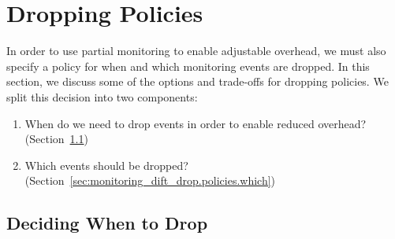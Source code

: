 \section{Dropping Policies} 
\label{sec:monitoring_dift_drop.policies}

In order to use partial monitoring to enable adjustable overhead, we must also
specify a policy for when and which monitoring events are dropped. In this
section, we discuss some of the options and trade-offs for dropping policies.
We split this decision into two components: 
\begin{enumerate} 
  \item When do we need to drop events in order to enable reduced overhead? (Section~\ref{sec:monitoring_dift_drop.policies.when}) 
  \item Which events should be dropped? (Section~\ref{sec:monitoring_dift_drop.policies.which}) 
\end{enumerate}

\subsection{Deciding When to Drop} 
\label{sec:monitoring_dift_drop.policies.when}

